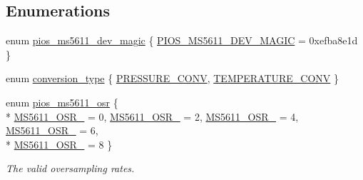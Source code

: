 \subsection*{Enumerations}
\begin{DoxyCompactItemize}
\item 
enum \hyperlink{group___p_i_o_s___m_s5611_ga3d4540192eb752517e6fc8aff70a97a8}{pios\-\_\-ms5611\-\_\-dev\-\_\-magic} \{ \hyperlink{group___p_i_o_s___m_s5611_gga3d4540192eb752517e6fc8aff70a97a8a27d4787a6d60788973baef12a43611e2}{P\-I\-O\-S\-\_\-\-M\-S5611\-\_\-\-D\-E\-V\-\_\-\-M\-A\-G\-I\-C} = 0xefba8e1d
 \}
\item 
enum \hyperlink{group___p_i_o_s___m_s5611_ga519b74aaa0203f0671cd8223b8db250a}{conversion\-\_\-type} \{ \hyperlink{group___p_i_o_s___m_s5611_gga519b74aaa0203f0671cd8223b8db250aa6bbea8dd296d93df2db36e840705af31}{P\-R\-E\-S\-S\-U\-R\-E\-\_\-\-C\-O\-N\-V}, 
\hyperlink{group___p_i_o_s___m_s5611_gga519b74aaa0203f0671cd8223b8db250aace547756a2c069fa9f1444ccd5e234f9}{T\-E\-M\-P\-E\-R\-A\-T\-U\-R\-E\-\_\-\-C\-O\-N\-V}
 \}
\item 
enum \hyperlink{group___p_i_o_s___m_s5611_gab2c6484befa4b5993218d392d4db0bd3}{pios\-\_\-ms5611\-\_\-osr} \{ \\*
\hyperlink{group___p_i_o_s___m_s5611_ggab2c6484befa4b5993218d392d4db0bd3aeef4ce47c7f22cd8c666c900bcda67e5}{M\-S5611\-\_\-\-O\-S\-R\-\_} = 0, 
\hyperlink{group___p_i_o_s___m_s5611_ggab2c6484befa4b5993218d392d4db0bd3a60c8665f8353b3864ad3963a3728a45c}{M\-S5611\-\_\-\-O\-S\-R\-\_} = 2, 
\hyperlink{group___p_i_o_s___m_s5611_ggab2c6484befa4b5993218d392d4db0bd3a26d56baed9a0b84d0b05eb809f9a5596}{M\-S5611\-\_\-\-O\-S\-R\-\_} = 4, 
\hyperlink{group___p_i_o_s___m_s5611_ggab2c6484befa4b5993218d392d4db0bd3a443ca046dbc9a4b28f86c7197b9da9a7}{M\-S5611\-\_\-\-O\-S\-R\-\_} = 6, 
\\*
\hyperlink{group___p_i_o_s___m_s5611_ggab2c6484befa4b5993218d392d4db0bd3a04b0d6cfe18bcce2c7ddc8fe21f7f6a2}{M\-S5611\-\_\-\-O\-S\-R\-\_} = 8
 \}
\begin{DoxyCompactList}\small\item\em The valid oversampling rates. \end{DoxyCompactList}\end{DoxyCompactItemize}
